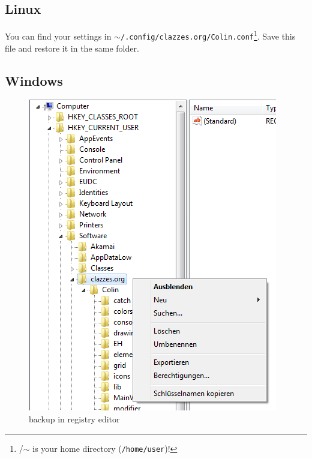 \documentclass[a4paper,11pt]{report}
\begin{document}
\subsection{Linux}

You can find your settings in \texttt{$\sim$/.config/clazzes.org/Colin.conf}\footnote{/$\sim$ is your home directory (\texttt{/home/user})!}. Save this file and restore it in the same folder.

\subsection{Windows}



\begin{minipage}[h]{0.5\textwidth-1.5cm}
\begin{figure}[H]
\includegraphics[width=\textwidth]{../pictures/regedit.png}
\caption{backup in registry editor}
\label{pic:regedit}
\end{figure}
\end{minipage}
\hfill
\end{document}
